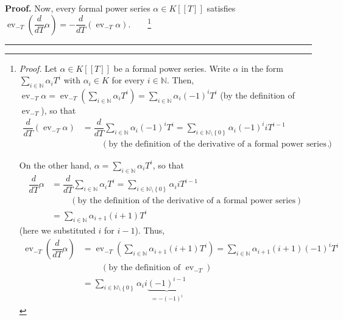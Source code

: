 \documentclass[numbers=enddot,12pt,final,onecolumn,notitlepage]{scrartcl}%
\newenvironment{proof}[1][Proof]{\noindent\textbf{#1.} }{\ \rule{0.5em}{0.5em}}
\begin{document}
\begin{proof}
Now, every formal power series $\alpha\in K\left[  \left[  T\right]  \right]
$ satisfies $\operatorname*{ev}\nolimits_{-T}\left(  \dfrac{d}{dT}%
\alpha\right)  =-\dfrac{d}{dT}\left(  \operatorname*{ev}\nolimits_{-T}%
\alpha\right)  $.\ \ \ \ \footnote{\textit{Proof.} Let $\alpha\in K\left[
\left[  T\right]  \right]  $ be a formal power series. Write $\alpha$ in the
form $\sum\limits_{i\in\mathbb{N}}\alpha_{i}T^{i}$ with $\alpha_{i}\in K$ for
every $i\in\mathbb{N}$. Then, $\operatorname*{ev}\nolimits_{-T}\alpha
=\operatorname*{ev}\nolimits_{-T}\left(  \sum\limits_{i\in\mathbb{N}}%
\alpha_{i}T^{i}\right)  =\sum\limits_{i\in\mathbb{N}}\alpha_{i}\left(
-1\right)  ^{i}T^{i}$ (by the definition of $\operatorname*{ev}\nolimits_{-T}%
$), so that%
\begin{align*}
\dfrac{d}{dT}\left(  \operatorname*{ev}\nolimits_{-T}\alpha\right)   &
=\dfrac{d}{dT}\sum\limits_{i\in\mathbb{N}}\alpha_{i}\left(  -1\right)
^{i}T^{i}=\sum\limits_{i\in\mathbb{N}\setminus\left\{  0\right\}  }\alpha
_{i}\left(  -1\right)  ^{i}iT^{i-1}\\
&  \ \ \ \ \ \ \ \ \ \ \left(  \text{by the definition of the derivative of a
formal power series}\right)  .
\end{align*}
\par
On the other hand, $\alpha=\sum\limits_{i\in\mathbb{N}}\alpha_{i}T^{i}$, so
that%
\begin{align*}
\dfrac{d}{dT}\alpha &  =\dfrac{d}{dT}\sum\limits_{i\in\mathbb{N}}\alpha
_{i}T^{i}=\sum\limits_{i\in\mathbb{N}\setminus\left\{  0\right\}  }\alpha
_{i}iT^{i-1}\\
&  \ \ \ \ \ \ \ \ \ \ \left(  \text{by the definition of the derivative of a
formal power series}\right) \\
&  =\sum\limits_{i\in\mathbb{N}}\alpha_{i+1}\left(  i+1\right)  T^{i}%
\end{align*}
(here we substituted $i$ for $i-1$). Thus,%
\begin{align*}
\operatorname*{ev}\nolimits_{-T}\left(  \dfrac{d}{dT}\alpha\right)   &
=\operatorname*{ev}\nolimits_{-T}\left(  \sum\limits_{i\in\mathbb{N}}%
\alpha_{i+1}\left(  i+1\right)  T^{i}\right)  =\sum\limits_{i\in\mathbb{N}%
}\alpha_{i+1}\left(  i+1\right)  \left(  -1\right)  ^{i}T^{i}\\
&  \ \ \ \ \ \ \ \ \ \ \left(  \text{by the definition of }\operatorname*{ev}%
\nolimits_{-T}\right) \\
&  =\sum\limits_{i\in\mathbb{N}\setminus\left\{  0\right\}  }\alpha
_{i}i\underbrace{\left(  -1\right)  ^{i-1}}_{=-\left(  -1\right)  ^{i}}%

\end{align*}}
\end{proof}
\end{document}
